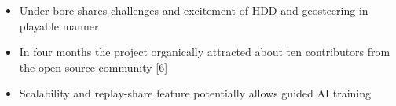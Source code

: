 
\begin{itemize}
\compresslist
	\item Under-bore shares challenges and excitement of HDD and geosteering in playable manner
	\item In four months the project organically attracted about ten contributors from the open-source community [6]
	\item Scalability and replay-share feature potentially allows guided AI training
\end{itemize}
